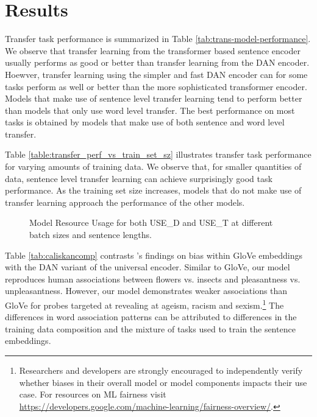 \documentclass[11pt,a4paper]{article}
\begin{document}
\section{Results}

Transfer task performance is summarized in Table \ref{tab:trans-model-performance}. We observe that transfer learning from the transformer based sentence encoder usually performs as good or better than transfer learning from the DAN encoder. Hoewver, transfer learning using the simpler and fast DAN encoder can for some tasks perform as well or better than the more sophisticated transformer encoder. Models that make use of sentence level transfer learning tend to perform better than models that only use word level transfer. The best performance on most tasks is obtained by models that make use of both sentence and word level transfer.

Table \ref{table:transfer_perf_vs_train_set_sz} illustrates transfer task performance for varying amounts of training data. We observe that, for smaller quantities of data, sentence level transfer learning can achieve surprisingly good task performance. As the training set size increases, models that do not make use of transfer learning approach the performance of the other models.

\begin{figure*}[ht!]
\small
     \hfill
     \hfill
\caption{Model Resource Usage for both USE\_D and USE\_T at different batch sizes and sentence lengths.  }
\label{fig:engbench}
\end{figure*}


Table \ref{tab:caliskancomp} contrasts 's findings on bias within GloVe embeddings with the DAN variant of the universal encoder. Similar to GloVe, our model reproduces human associations between flowers vs. insects and pleasantness vs. unpleasantness. However, our model demonstrates weaker associations than GloVe for probes targeted at revealing at ageism, racism and sexism.\footnote{Researchers and developers are strongly encouraged to independently verify whether biases in their overall model or model components impacts their use case. For resources on ML fairness visit \href{https://developers.google.com/machine-learning/fairness-overview/}{https://developers.google.com/machine-learning/fairness-overview/}. } The differences in word association patterns can be attributed to differences in the training data composition and the mixture of tasks used to train the sentence embeddings.
\end{document}
